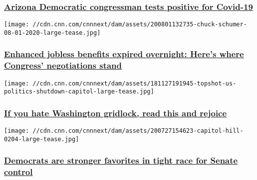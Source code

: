 \hypertarget{arizona-democratic-congressman-tests-positive-for-covid-19}{%
\subsubsection{\texorpdfstring{\href{/2020/08/01/politics/raul-grijalva-tests-positive-covid-19/index.html}{Arizona
Democratic congressman tests positive for
Covid-19}}{Arizona Democratic congressman tests positive for Covid-19}}\label{arizona-democratic-congressman-tests-positive-for-covid-19}}

\href{/2020/08/01/politics/unemployment-benefits-expire-congress-negotiations/index.html}{}

\texttt{[image: //cdn.cnn.com/cnnnext/dam/assets/200801132735-chuck-schumer-08-01-2020-large-tease.jpg]}

\hypertarget{enhanced-jobless-benefits-expired-overnight-heres-where-congress-negotiations-stand}{%
\subsubsection{\texorpdfstring{\href{/2020/08/01/politics/unemployment-benefits-expire-congress-negotiations/index.html}{Enhanced
jobless benefits expired overnight: Here's where Congress' negotiations
stand}}{Enhanced jobless benefits expired overnight: Here's where Congress' negotiations stand}}\label{enhanced-jobless-benefits-expired-overnight-heres-where-congress-negotiations-stand}}

\href{/2020/08/01/politics/what-matters-july-31/index.html}{}

\texttt{[image: //cdn.cnn.com/cnnnext/dam/assets/181127191945-topshot-us-politics-shutdown-capitol-large-tease.jpg]}

\hypertarget{if-you-hate-washington-gridlock-read-this-and-rejoice}{%
\subsubsection{\texorpdfstring{\href{/2020/08/01/politics/what-matters-july-31/index.html}{If
you hate Washington gridlock, read this and
rejoice}}{If you hate Washington gridlock, read this and rejoice}}\label{if-you-hate-washington-gridlock-read-this-and-rejoice}}

\href{/2020/08/01/politics/senate-map-analysis/index.html}{}

\texttt{[image: //cdn.cnn.com/cnnnext/dam/assets/200727154623-capitol-hill-0204-large-tease.jpg]}

\hypertarget{democrats-are-stronger-favorites-in-tight-race-for-senate-control}{%
\subsubsection{\texorpdfstring{\href{/2020/08/01/politics/senate-map-analysis/index.html}{Democrats
are stronger favorites in tight race for Senate
control}}{Democrats are stronger favorites in tight race for Senate control}}\label{democrats-are-stronger-favorites-in-tight-race-for-senate-control}}

